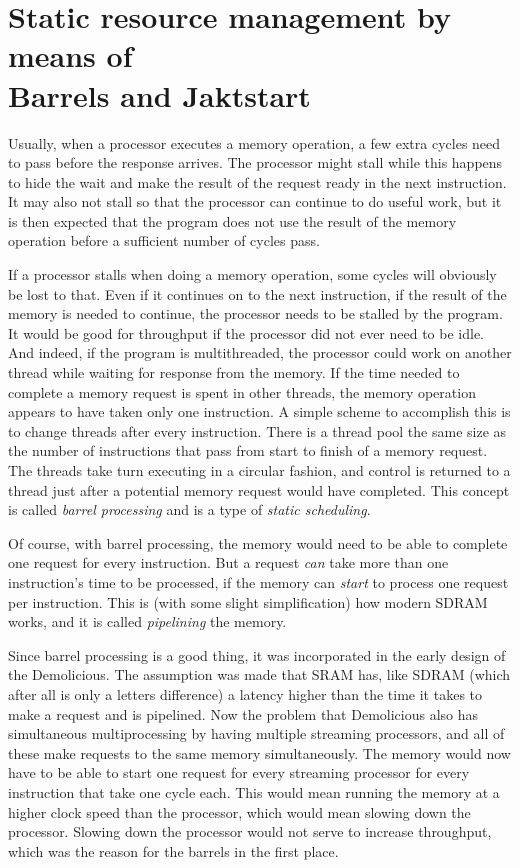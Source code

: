 \documentclass[../main/report.tex]{subfiles}
\begin{document}
\section{Static resource management by means of\\
Barrels and Jaktstart}

Usually, when a processor executes a memory operation, a few extra cycles need to pass before the response arrives.
The processor might stall while this happens to hide the wait and make the result of the request ready in the next instruction.
It may also not stall so that the processor can continue to do useful work, but it is then expected that the program does not use the result of the memory operation before a sufficient number of cycles pass.

If a processor stalls when doing a memory operation, some cycles will obviously be lost to that.
Even if it continues on to the next instruction, if the result of the memory is needed to continue, the processor needs to be stalled by the program.
It would be good for throughput if the processor did not ever need to be idle.
And indeed, if the program is multithreaded, the processor could work on another thread while waiting for response from the memory.
If the time needed to complete a memory request is spent in other threads, the memory operation appears to have taken only one instruction.
A simple scheme to accomplish this is to change threads after every instruction.
There is a thread pool the same size as the number of instructions that pass from start to finish of a memory request.
The threads take turn executing in a circular fashion, and control is returned to a thread just after a potential memory request would have completed.
This concept is called \emph{barrel processing} and is a type of \emph{static scheduling}.

Of course, with barrel processing, the memory would need to be able to complete one request for every instruction.
But a request \emph{can} take more than one instruction's time to be processed, if the memory can \emph{start} to process one request per instruction.
This is (with some slight simplification) how modern SDRAM works, and it is called \emph{pipelining} the memory.

Since barrel processing is a good thing\texttrademark, it was incorporated in the early design of the Demolicious.
The assumption was made that SRAM has, like SDRAM (which after all is only a letters difference) a latency higher than the time it takes to make a request and is pipelined.
Now the problem that Demolicious also has simultaneous multiprocessing by having multiple streaming processors, and all of these make requests to the same memory simultaneously.
The memory would now have to be able to start one request for every streaming processor for every instruction that take one cycle each.
This would mean running the memory at a higher clock speed than the processor, which would mean slowing down the processor.
Slowing down the processor would not serve to increase throughput, which was the reason for the barrels in the first place.
\end{document}

